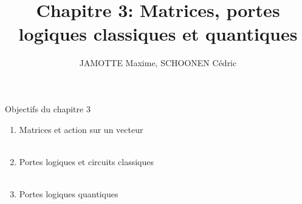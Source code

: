 \documentclass[aspectratio=169,12pt]{beamer}
\begin{document}
\title[Chapter 3]{Chapitre 3: Matrices, portes logiques classiques et quantiques}
\author{JAMOTTE Maxime, SCHOONEN Cédric}
\date{}

\begin{frame}
  \titlepage
\end{frame}

\begin{frame}{Objectifs du chapitre 3}
  \begin{enumerate}
    \item Matrices et action sur un vecteur\\~\\
    \item Portes logiques et circuits classiques\\~\\
    \item Portes logiques quantiques
  \end{enumerate}
\end{frame}
\end{document}
